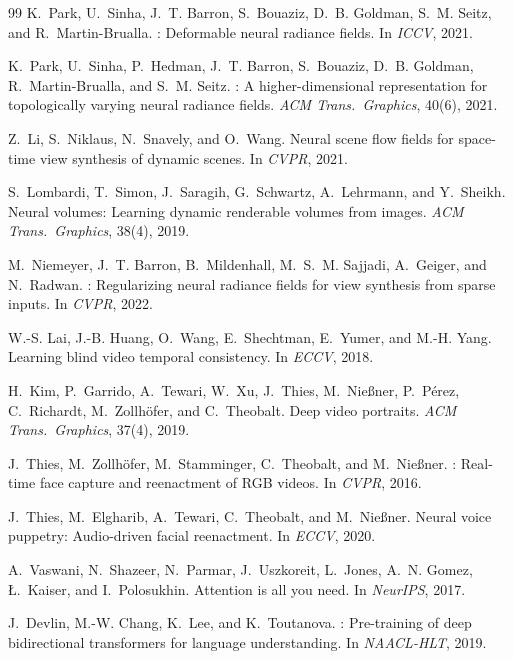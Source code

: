 \documentclass[10pt,twocolumn,letterpaper]{article}
\begin{document}
{\begin{thebibliography}{99}
K.~Park, U.~Sinha, J.~T. Barron, S.~Bouaziz, D.~B. Goldman, S.~M. Seitz, and R.~Martin-Brualla.
: Deformable neural radiance fields.
\newblock In \emph{ICCV}, 2021.

K.~Park, U.~Sinha, P.~Hedman, J.~T. Barron, S.~Bouaziz, D.~B. Goldman, R.~Martin-Brualla, and S.~M. Seitz.
: A higher-dimensional representation for topologically varying neural radiance fields.
\newblock \emph{ACM Trans.\ Graphics}, 40(6), 2021.

Z.~Li, S.~Niklaus, N.~Snavely, and O.~Wang.
\newblock Neural scene flow fields for space-time view synthesis of dynamic scenes.
\newblock In \emph{CVPR}, 2021.

S.~Lombardi, T.~Simon, J.~Saragih, G.~Schwartz, A.~Lehrmann, and Y.~Sheikh.
\newblock Neural volumes: Learning dynamic renderable volumes from images.
\newblock \emph{ACM Trans.\ Graphics}, 38(4), 2019.

M.~Niemeyer, J.~T. Barron, B.~Mildenhall, M.~S.~M. Sajjadi, A.~Geiger, and N.~Radwan.
: Regularizing neural radiance fields for view synthesis from sparse inputs.
\newblock In \emph{CVPR}, 2022.

W.-S. Lai, J.-B. Huang, O.~Wang, E.~Shechtman, E.~Yumer, and M.-H. Yang.
\newblock Learning blind video temporal consistency.
\newblock In \emph{ECCV}, 2018.

H.~Kim, P.~Garrido, A.~Tewari, W.~Xu, J.~Thies, M.~Nie{\ss}ner, P.~P{\'e}rez, C.~Richardt, M.~Zollh{\"o}fer, and C.~Theobalt.
\newblock Deep video portraits.
\newblock \emph{ACM Trans.\ Graphics}, 37(4), 2019.

J.~Thies, M.~Zollh{\"o}fer, M.~Stamminger, C.~Theobalt, and M.~Nie{\ss}ner.
: Real-time face capture and reenactment of {RGB} videos.
\newblock In \emph{CVPR}, 2016.

J.~Thies, M.~Elgharib, A.~Tewari, C.~Theobalt, and M.~Nie{\ss}ner.
\newblock Neural voice puppetry: Audio-driven facial reenactment.
\newblock In \emph{ECCV}, 2020.

A.~Vaswani, N.~Shazeer, N.~Parmar, J.~Uszkoreit, L.~Jones, A.~N. Gomez, {\L}.~Kaiser, and I.~Polosukhin.
\newblock Attention is all you need.
\newblock In \emph{NeurIPS}, 2017.

J.~Devlin, M.-W. Chang, K.~Lee, and K.~Toutanova.
: Pre-training of deep bidirectional transformers for language understanding.
\newblock In \emph{NAACL-HLT}, 2019.


\end{thebibliography}}
\end{document}
